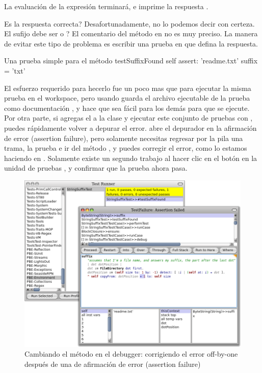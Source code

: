 \documentclass[spanish,a4paper,10pt,twoside]{book}
\begin{document}

La evaluaci\'on de la expresi\'on  terminar\'a, e imprime la respuesta .

Es la respuesta correcta?  Desafortunadamente, no lo podemos decir con certeza.  El sufijo debe ser  o ?
El comentario del m\'etodo en  no es muy preciso.
La manera de evitar este tipo de problema es escribir una prueba en  que defina la respuesta.

\begin{method}[testSuffix]{Una prueba simple para el m\'etodo }
testSuffixFound
	self assert: 'readme.txt' suffix = 'txt'
\end{method}

El esfuerzo requerido para hecerlo fue un poco mas que para ejecutar la misma prueba en el workspace, pero usando \sunit guarda el archivo ejecutable de la prueba como documentaci\'on , y hace que sea f\'acil para los dem\'as para que se ejecute.
Por otra parte, si agregas el  a la clase  y ejecutar este conjunto de pruebas con \sunit, puedes r\'apidamente volver a depurar el error.
\sunit abre el depurador en la afirmaci\'on de error (assertion failure), pero solamente necesitas regresar por la pila una trama,  la prueba e ir  del m\'etodo  , y puedes corregir el error, como lo estamos haciendo en .
Solamente existe un segundo trabajo al hacer clic en el bot\'on  en la unidad de pruebas  \sunit, y confirmar que la prueba ahora pasa.

\begin{figure}[btp]
	\begin{center}
		\includegraphics[width=\textwidth]{fixOffByOne}
	\end{center}
	\caption{Cambiando el m\'etodo  en el debugger: corrigiendo el error
	off-by-one despu\'es de una \sunit de afirmaci\'on de error (assertion failure)}
\end{figure}
\end{document}
